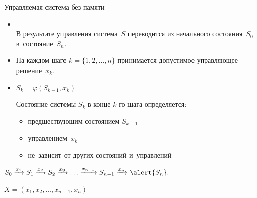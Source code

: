 \documentclass[unicode,11pt,notheorems,xcolor=table]{beamer}
\begin{document}
\begin{frame}{Управляемая система без памяти}{}

\begin{itemize}

\item {}\\
	В результате управления система~$S$ переводится из начального состояния~$S_0$  в~состояние~$S_n$. 

\item 
	На каждом шаге  $k = \{1,2,\ldots, n\}$ принимается допустимое управляющее решение~$x_k$.





\item {} 		$S_k=\varphi(S_{k-1},x_k)$

		Состояние системы $S_k$ в конце $k$-го шага определяется:
		\begin{itemize}
		\item 
			предшествующим состоянием $S_{k-1}$
		\item 
		 	управлением~$x_k$ 
		\item 
		 	 \alert{не~зависит от других состояний и~управлений}		
		 \end{itemize}

\end{itemize}

\bigskip
{}
$S_0 \xrightarrow{x_1} S_1\xrightarrow{x_2} S_2 \xrightarrow{x_3}\ldots\xrightarrow{x_{n-1}} S_{n-1} \xrightarrow{x_n} \alert{S_n}.
$

\smallskip
{}\hspace{16mm} $X = (x_1,x_2,\ldots,x_{n-1},x_n)$
\end{frame}
\end{document}
